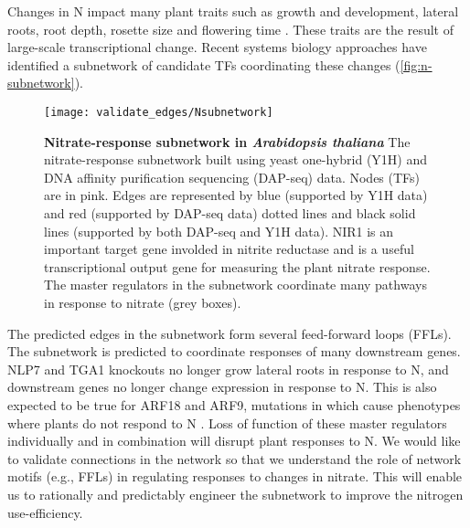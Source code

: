 \documentclass[../main.tex]{subfiles}
\begin{document}
Changes in N impact many plant traits such as growth and development, lateral roots, root depth, rosette size and flowering time \autocite{abalosPlantTraitbasedApproaches2019,castromarinNitrateRegulatesFloral2011}.
These traits are the result of large\hyp{}scale transcriptional change.
Recent systems biology approaches have identified a subnetwork of candidate TFs coordinating these changes \autocite{gaudinierTranscriptionalRegulationNitrogenassociated2018,varalaTemporalTranscriptionalLogic2018} (\autoref{fig:n-subnetwork}).

\begin{figure}[hbt!]
	\begin{center}
		\capstart
		\texttt{[image: validate\_edges/Nsubnetwork]}
		\caption{
			\textbf{Nitrate\hyp{}response subnetwork in \textit{Arabidopsis thaliana}}
			The nitrate\hyp{}response subnetwork built using yeast one\hyp{}hybrid (Y1H) \autocite{gaudinierTranscriptionalRegulationNitrogenassociated2018} and DNA affinity purification sequencing (DAP-seq) \autocite{omalleyCistromeEpicistromeFeatures2016} data.
            Nodes (TFs) are in pink.
            Edges are represented by blue (supported by Y1H data) and red (supported by DAP-seq data) dotted lines and black solid lines (supported by both DAP-seq and Y1H data).
            NIR1 is an important target gene involded in nitrite reductase and is a useful transcriptional output gene for measuring the plant nitrate response.
            The master regulators in the subnetwork coordinate many pathways in response to nitrate (grey boxes).
			\label{fig:n-subnetwork}
		}
	\end{center}
\end{figure}

The predicted edges in the subnetwork form several feed\hyp{}forward loops (FFLs).
The subnetwork is predicted to coordinate responses of many downstream genes.
NLP7 and TGA1 knockouts no longer grow lateral roots in response to N, and downstream genes no longer change expression in response to N.
This is also expected to be true for ARF18 and ARF9, mutations in which cause phenotypes where plants do not respond to N \autocite{gaudinierTranscriptionalRegulationNitrogenassociated2018}.
Loss of function of these master regulators individually and in combination will disrupt plant responses to N.
We would like to validate connections in the network so that we understand the role of network motifs (e.g., FFLs) in regulating responses to changes in nitrate.
This will enable us to rationally and predictably engineer the subnetwork to improve the nitrogen use\hyp{}efficiency.
\end{document}
